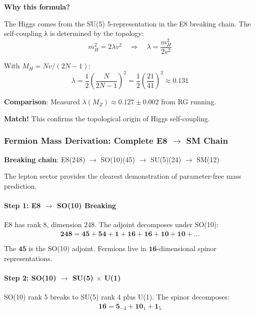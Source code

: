 \documentclass[12pt,a4paper]{article}
\begin{document}
\textbf{Why this formula?}

The Higgs comes from the SU(5) 5-representation in the E8 breaking chain. The self-coupling λ is determined by the topology:
\begin{equation}
m_H^2 = 2\lambda v^2 \quad \Rightarrow \quad \lambda = \frac{m_H^2}{2v^2}
\end{equation}

With $M_H = Nv/(2N-1)$:
\begin{equation}
\lambda = \frac{1}{2} \left(\frac{N}{2N-1}\right)^2 = \frac{1}{2} \left(\frac{21}{41}\right)^2 \approx 0.131
\end{equation}

\textbf{Comparison}: Measured $\lambda(M_Z) \approx 0.127 \pm 0.002$ from RG running.

\textbf{Match!} This confirms the topological origin of Higgs self-coupling.

\subsubsection{Fermion Mass Derivation: Complete E8 $\to$ SM Chain}

\textbf{Breaking chain}: E8(248) $\to$ SO(10)(45) $\to$ SU(5)(24) $\to$ SM(12)

The lepton sector provides the clearest demonstration of parameter-free mass prediction.

\paragraph{Step 1: E8 $\to$ SO(10) Breaking}

E8 has rank 8, dimension 248. The adjoint decomposes under SO(10):
\begin{equation}
\mathbf{248} = \mathbf{45} + \mathbf{54} + \mathbf{1} + \mathbf{16} + \mathbf{\overline{16}} + \mathbf{10} + \mathbf{\overline{10}} + \ldots
\end{equation}

The $\mathbf{45}$ is the SO(10) adjoint. Fermions live in $\mathbf{16}$-dimensional spinor representations.

\paragraph{Step 2: SO(10) $\to$ SU(5) $\times$ U(1)}

SO(10) rank 5 breaks to SU(5) rank 4 plus U(1). The spinor decomposes:
\begin{equation}
\mathbf{16} = \mathbf{\overline{5}}_{-3} + \mathbf{10}_{1} + \mathbf{1}_{5}
\end{equation}
\end{document}
